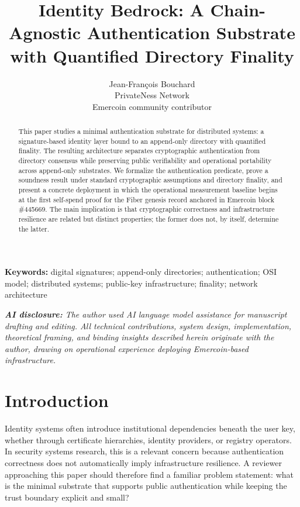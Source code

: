 \documentclass[11pt,a4paper]{article}
\title{Identity Bedrock: A Chain-Agnostic Authentication Substrate with Quantified Directory Finality}
\author{Jean-Fran\c{c}ois Bouchard\\
\small PrivateNess Network\\
\small Emercoin community contributor}
\date{}
\newcommand{\keywords}[1]{\par\noindent\textbf{Keywords:} #1\par}
\begin{document}
\maketitle
{}

\keywords{digital signatures; append-only directories; authentication; OSI model; distributed systems; public-key infrastructure; finality; network architecture}

\vspace{1.1em}

\begin{abstract}
This paper studies a minimal authentication substrate for distributed systems: a signature-based identity layer bound to an append-only directory with quantified finality. The resulting architecture separates cryptographic authentication from directory consensus while preserving public verifiability and operational portability across append-only substrates. We formalize the authentication predicate, prove a soundness result under standard cryptographic assumptions and directory finality, and present a concrete deployment in which the operational measurement baseline begins at the first self-spend proof for the Fiber genesis record anchored in Emercoin block \#445669. The main implication is that cryptographic correctness and infrastructure resilience are related but distinct properties; the former does not, by itself, determine the latter.
\end{abstract}

\vspace{0.6em}

\begin{center}
\small\itshape
\textbf{AI disclosure:} The author used AI language model assistance for manuscript drafting and editing. All technical contributions, system design, implementation, theoretical framing, and binding insights described herein originate with the author, drawing on operational experience deploying Emercoin-based infrastructure.
\end{center}

\clearpage

\tableofcontents
\clearpage

\section{Introduction}

Identity systems often introduce institutional dependencies beneath the user key, whether through certificate hierarchies, identity providers, or registry operators. In security systems research, this is a relevant concern because authentication correctness does not automatically imply infrastructure resilience. A reviewer approaching this paper should therefore find a familiar problem statement: what is the minimal substrate that supports public authentication while keeping the trust boundary explicit and small?
\end{document}
